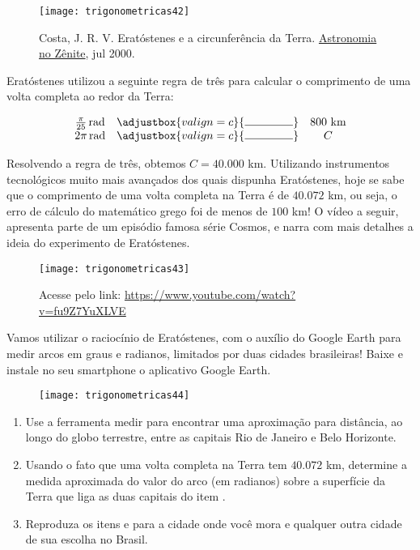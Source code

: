 \documentclass[10 pt,usenames,dvipsnames, oneside]{article}
\begin{document}
\begin{figure}[H]
\centering

\texttt{[image: trigonometricas42]}
\caption{Costa, J. R. V. Eratóstenes e a circunferência da Terra. \href{https://www.zenite.nu/eratostenes-e-a-circunferencia-da-terra/}{Astronomia no Zênite}, jul 2000.}
\label{zenite}
\end{figure}

Eratóstenes utilizou a seguinte regra de três para calcular o comprimento de uma volta completa ao redor da Terra:


\begin{equation*}
\begin{array}{ccc}
\frac{\pi}{25} \rad & \adjustbox{valign=c}{\tikz \draw (0,0) -- (1.5,0);} & 800 \text{ km} \\
2\pi\rad & \adjustbox{valign=c}{\tikz \draw (0,0) -- (1.5,0);} & C 
\end{array}
\end{equation*}

Resolvendo a regra de três, obtemos $C = 40.000$ km. Utilizando instrumentos tecnológicos muito mais avançados dos quais dispunha Eratóstenes, hoje se sabe que o comprimento de uma volta completa na Terra é de $40.072$ km, ou seja, o erro de cálculo do matemático grego foi de menos de $100$ km! O vídeo a seguir, apresenta parte de um episódio famosa série Cosmos, e narra com mais detalhes a ideia do experimento de Eratóstenes.

\begin{figure}[H]
\centering

\texttt{[image: trigonometricas43]}

\caption{Acesse pelo link: \url{https://www.youtube.com/watch?v=fu9Z7YuXLVE}}
\end{figure}

Vamos utilizar o raciocínio de Eratóstenes, com o auxílio do Google Earth para medir arcos em graus e radianos, limitados por duas cidades brasileiras! Baixe e instale no seu smartphone o aplicativo Google Earth.


\begin{figure}[H]
\centering

\texttt{[image: trigonometricas44]}
\end{figure}

\begin{enumerate}
\item Use a ferramenta medir para encontrar uma aproximação para distância, ao longo do globo terrestre, entre as capitais Rio de Janeiro e Belo Horizonte.
\item Usando o fato que uma volta completa na Terra tem $40.072$ km, determine a medida aproximada do valor do arco (em radianos) sobre a superfície da Terra que liga as duas capitais do item .
\item Reproduza os itens  e  para a cidade onde você mora e qualquer outra cidade de sua escolha no Brasil.
\end{enumerate}
\end{document}
